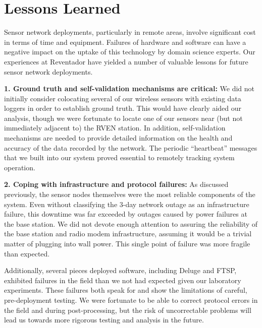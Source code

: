\section{Lessons Learned}
\label{sec-lessons}

Sensor network deployments, particularly in remote areas, involve 
significant cost in terms of time and equipment. Failures of hardware
and software can have a negative impact on the uptake of this technology 
by domain science experts. Our experiences at Reventador have yielded 
a number of valuable lessons for future sensor network deployments. 


{\bf 1. Ground truth and self-validation mechanisms are critical:}
We did not initially consider colocating several of our wireless
sensors with existing data loggers in order to establish ground
truth. This would have clearly aided our analysis, though we 
were fortunate to locate one of
our sensors near (but not immediately adjacent to) the RVEN station.
In addition, self-validation mechanisms are needed to provide detailed
information on the health and accuracy of the data recorded by the
network. The periodic ``heartbeat'' messages that we built into our 
system proved essential to remotely tracking system operation.

{\bf 2. Coping with infrastructure and protocol failures:} As discussed
previously, the sensor nodes themselves were the most reliable 
components of the system. Even without classifying the 3-day network outage 
as an infrastructure failure, this downtime was far exceeded by outages 
caused by power failures at the base station. 
We did not devote enough attention to assuring the reliability of the
base station and radio modem infrastructure, assuming it would be a
trivial matter of plugging into wall power. This single point
of failure was more fragile than expected.

Additionally, several pieces deployed software, including Deluge and FTSP,
exhibited failures in the field than we not had expected given our laboratory
experiments.  These failures both speak for and show the limitations of
careful, pre-deployment testing.  We were fortunate to be able to correct
protocol errors in the field and during post-processing, but the risk of
uncorrectable problems will lead us towards more rigorous testing and
analysis in the future.

